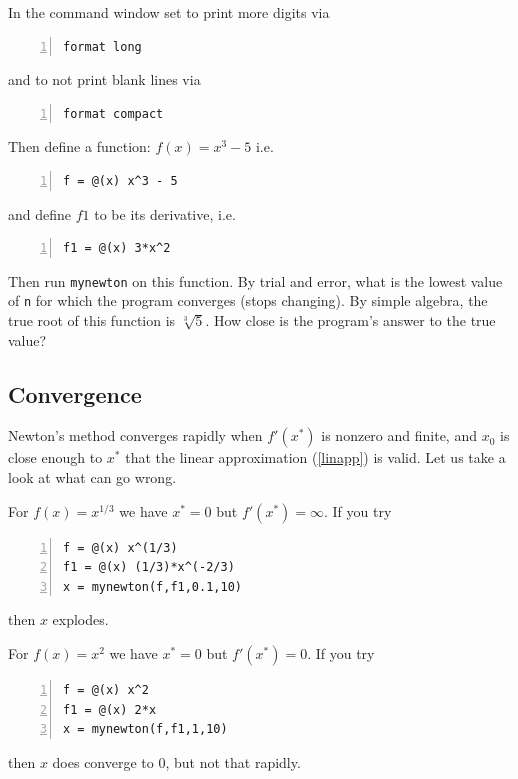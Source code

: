 In the command window set to print more digits via
\begin{lstlisting}[frame=none,numbers=left]
format long
\end{lstlisting}
and to not print blank lines via
\begin{lstlisting}[frame=none,numbers=left]
format compact
\end{lstlisting}
Then define a function: $f(x) = x^3 - 5$
i.e.
\begin{lstlisting}[frame=none,numbers=left]
f = @(x) x^3 - 5
\end{lstlisting}
and define $f1$ to be its derivative, i.e.
\begin{lstlisting}[frame=none,numbers=left]
f1 = @(x) 3*x^2
\end{lstlisting}
Then run \verb&mynewton& on this function.
By trial and error, what is the lowest value of \verb&n& for which the
program converges (stops changing).  By simple algebra, the true root
of this function is $\sqrt[3]{5}$. How close is the program's answer
to the true value?


\subsection*{Convergence}

Newton's method converges rapidly when $f'(x^*)$ is nonzero and
finite, and $x_0$ is close enough to $x^*$ that the  linear approximation
(\ref{linapp}) is valid.
Let us take a look at what can go wrong.

For $f(x)=x^{1/3}$ we have $x^*=0$ but $f'(x^*)=\infty$.  If you try
\begin{lstlisting}[frame=none,numbers=left]
f = @(x) x^(1/3)
f1 = @(x) (1/3)*x^(-2/3)
x = mynewton(f,f1,0.1,10)
\end{lstlisting}
then $x$ explodes.

For $f(x)=x^2$ we have $x^*=0$ but $f'(x^*)=0$.  If you try
\begin{lstlisting}[frame=none,numbers=left]
f = @(x) x^2
f1 = @(x) 2*x
x = mynewton(f,f1,1,10)
\end{lstlisting}
then $x$ does converge to $0$, but not that rapidly.

